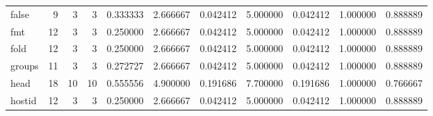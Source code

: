 \begin{tabular}{lrrrrrrrrrr}
false     &                                       9 &                  3 &                                 3 &                                   0.333333 &                               2.666667 &                                     0.042412 &                          5.000000 &                                0.042412 &                           1.000000 &                                           0.888889 \\
fmt       &                                      12 &                  3 &                                 3 &                                   0.250000 &                               2.666667 &                                     0.042412 &                          5.000000 &                                0.042412 &                           1.000000 &                                           0.888889 \\
fold      &                                      12 &                  3 &                                 3 &                                   0.250000 &                               2.666667 &                                     0.042412 &                          5.000000 &                                0.042412 &                           1.000000 &                                           0.888889 \\
groups    &                                      11 &                  3 &                                 3 &                                   0.272727 &                               2.666667 &                                     0.042412 &                          5.000000 &                                0.042412 &                           1.000000 &                                           0.888889 \\
head      &                                      18 &                 10 &                                10 &                                   0.555556 &                               4.900000 &                                     0.191686 &                          7.700000 &                                0.191686 &                           1.000000 &                                           0.766667 \\
hostid    &                                      12 &                  3 &                                 3 &                                   0.250000 &                               2.666667 &                                     0.042412 &                          5.000000 &                                0.042412 &                           1.000000 &                                           0.888889 \\

\end{tabular}
